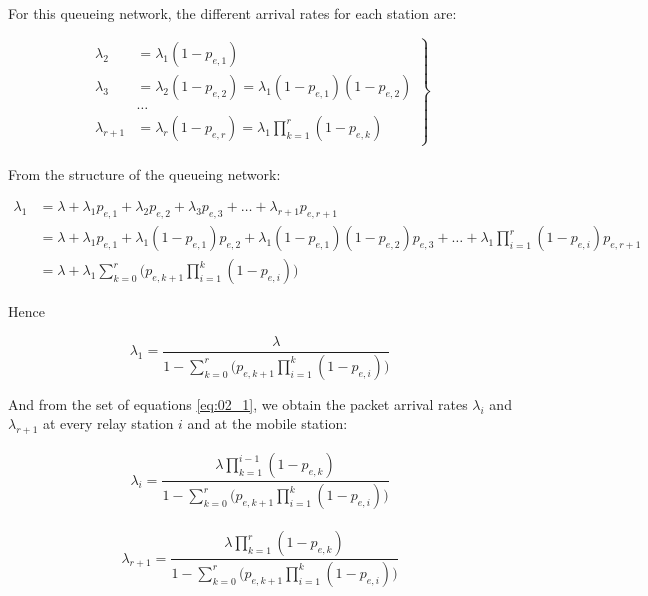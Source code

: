 For this queueing network, the different arrival rates for each station are:

\begin{equation}
 \left.
  \begin{array}{ll}
  \lambda_2 &= \lambda_1 (1 - p_{e,1}) \\
  \lambda_3 &= \lambda_2 (1 - p_{e,2}) = \lambda_1 (1 - p_{e,1}) (1 - p_{e,2}) \\
  & \dots \\
  \lambda_{r+1} &= \lambda_r (1-p_{e,r}) = \lambda_1 \prod\limits_{k=1}^{r} (1 - p_{e,k})
  \end{array}
\right\} \label{eq:02_1}
\end{equation} \\

From the structure of the queueing network:

\begin{align*}
  \lambda_1 &= \lambda + \lambda_1 p_{e,1} + \lambda_2 p_{e,2} + \lambda_3 p_{e,3}
  + \dots
  + \lambda_{r+1} p_{e,r+1} \\
  ~ &= \lambda + \lambda_1 p_{e,1} + \lambda_1 (1 - p_{e,1}) p_{e,2}
  + \lambda_1 (1 - p_{e,1})(1 - p_{e,2}) p_{e,3}
  + \dots
  + \lambda_1 \prod\limits_{i=1}^r (1 - p_{e,i}) p_{e,r+1} \\
  ~ &= \lambda + \lambda_1 \sum_{k=0}^r \Big(p_{e,k+1} \prod\limits_{i=1}^k (1 - p_{e,i})\Big)
\end{align*}

Hence

\begin{equation*}
  \lambda_1 = \dfrac{\lambda}{1 - \sum\limits_{k=0}^r \Big(p_{e,k+1} \prod\limits_{i=1}^k (1 - p_{e,i})\Big)}
\end{equation*}

And from the set of equations \ref{eq:02_1}, we obtain the packet arrival rates
$\lambda_i$ and $\lambda_{r+1}$ at every relay station $i$ and at the mobile
station:

\begin{align*}
  \lambda_i = \dfrac{\lambda \prod\limits_{k=1}^{i-1} (1 - p_{e,k})}{1 - \sum\limits_{k=0}^r \Big(p_{e,k+1} \prod\limits_{i=1}^k (1 - p_{e,i})\Big)}
\end{align*}

\begin{align*}
  \lambda_{r+1} = \dfrac{\lambda \prod\limits_{k=1}^{r} (1 - p_{e,k})}{1 - \sum\limits_{k=0}^r \Big(p_{e,k+1} \prod\limits_{i=1}^k (1 - p_{e,i})\Big)}
\end{align*}


